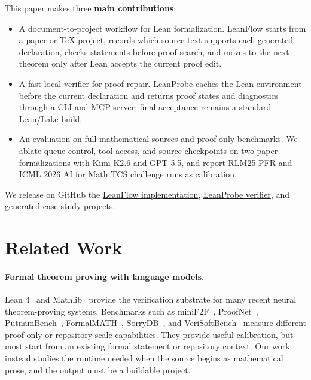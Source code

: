 \documentclass{article}
\newcommand{\method}{LeanFlow\xspace}
\newcommand{\kimi}{Kimi-K2.6\xspace}
\newcommand{\gpt}{GPT-5.5\xspace}
\newcommand{\lean}{Lean\xspace}
\newcommand{\mathlib}{Mathlib\xspace}
\begin{document}
This paper makes three \textbf{main contributions}:
\begin{itemize}
    \item A document-to-project workflow for \lean formalization. \method starts from a paper or \TeX{} project, records which source text supports each generated declaration, checks statements before proof search, and moves to the next theorem only after \lean accepts the current proof edit.
    \item A fast local verifier for proof repair. LeanProbe caches the \lean environment before the current declaration and returns proof states and diagnostics through a CLI and MCP server; final acceptance remains a standard \lean/Lake build.
    \item An evaluation on full mathematical sources and proof-only benchmarks. We ablate queue control, tool access, and source checkpoints on two paper formalizations with \kimi and \gpt, and report RLM25-PFR and ICML 2026 AI for Math TCS challenge runs as calibration.
\end{itemize}
We release on GitHub the \href{https://github.com/epfl-lara/LeanFlow}{\method implementation},
\href{https://github.com/epfl-lara/LeanProbe}{LeanProbe verifier}, and
\href{https://github.com/epfl-lara/AutoformalizedProjects}{generated case-study projects}.

\section{Related Work}

\paragraph{Formal theorem proving with language models.}
Lean 4~\citep{demoura2021lean4} and \mathlib~\citep{mathlib2020} provide the verification substrate for many recent neural theorem-proving systems.
Benchmarks such as miniF2F~\citep{zheng2022minif2f}, ProofNet~\citep{azerbayev2023proofnet}, PutnamBench~\citep{tsoukalas2024putnambench}, FormalMATH~\citep{yu2025formalmath}, SorryDB~\citep{letson2026sorrydb}, and VeriSoftBench~\citep{xin2026verisoftbench} measure different proof-only or repository-scale capabilities.
They provide useful calibration, but most start from an existing formal statement or repository context.
Our work instead studies the runtime needed when the source begins as mathematical prose, and the output must be a buildable project.
\end{document}
